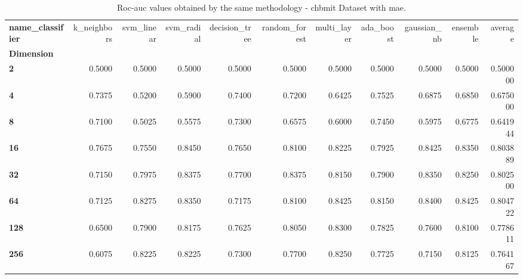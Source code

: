 \begin{table}
\centering
\caption{Roc-auc values obtained by the same methodology - chbmit Dataset with mae.}
\label{roc-auc_chbmit_mae-reproduction}
\begin{tabular}{lrrrrrrrrrr}
\toprule
\textbf{name\_classifier} &  k\_neighbors &  svm\_linear &  svm\_radial &  decision\_tree &  random\_forest &  multi\_layer &  ada\_boost &  gaussian\_nb &  ensemble &   average \\
\textbf{Dimension} &              &             &             &                &                &              &            &              &           &           \\
\midrule
\textbf{2        } &       0.5000 &      0.5000 &      0.5000 &         0.5000 &         0.5000 &       0.5000 &     0.5000 &       0.5000 &    0.5000 &  0.500000 \\
\textbf{4        } &       0.7375 &      0.5200 &      0.5900 &         0.7400 &         0.7200 &       0.6425 &     0.7525 &       0.6875 &    0.6850 &  0.675000 \\
\textbf{8        } &       0.7100 &      0.5025 &      0.5575 &         0.7300 &         0.6575 &       0.6000 &     0.7450 &       0.5975 &    0.6775 &  0.641944 \\
\textbf{16       } &       0.7675 &      0.7550 &      0.8450 &         0.7650 &         0.8100 &       0.8225 &     0.7925 &       0.8425 &    0.8350 &  0.803889 \\
\textbf{32       } &       0.7150 &      0.7975 &      0.8375 &         0.7700 &         0.8375 &       0.8150 &     0.7900 &       0.8350 &    0.8250 &  0.802500 \\
\textbf{64       } &       0.7125 &      0.8275 &      0.8350 &         0.7175 &         0.8100 &       0.8425 &     0.8150 &       0.8400 &    0.8425 &  0.804722 \\
\textbf{128      } &       0.6500 &      0.7900 &      0.8175 &         0.7625 &         0.8050 &       0.8300 &     0.7825 &       0.7600 &    0.8100 &  0.778611 \\
\textbf{256      } &       0.6075 &      0.8225 &      0.8225 &         0.7300 &         0.7700 &       0.8250 &     0.7725 &       0.7150 &    0.8125 &  0.764167 \\
\bottomrule
\end{tabular}
\end{table}
